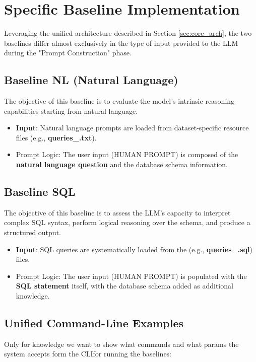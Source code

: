 \section{Specific Baseline Implementation}
\label{sec:Baselines}
Leveraging the unified architecture described in Section \ref{sec:core_arch}, the two baselines differ almost exclusively in the type of input provided to the LLM during the "Prompt Construction" phase.

\subsection{Baseline NL (Natural Language)}
The objective of this baseline is to evaluate the model's intrinsic reasoning capabilities starting from natural language.
\begin{itemize}
    \item \textbf{Input}: Natural language prompts are loaded from dataset-specific resource files (e.g., \textbf{queries\_<dataset-name>.txt}).
    \item Prompt Logic: The user input (HUMAN PROMPT) is composed of the \textbf{natural language question} and the database schema information.
\end{itemize}

\subsection{Baseline SQL}
The objective of this baseline is to assess the LLM's capacity to interpret complex SQL syntax, perform logical reasoning over the schema, and produce a structured output.\begin{itemize}
    \item \textbf{Input}: SQL queries are systematically loaded from the (e.g., \textbf{queries\_<dataset-name>.sql}) files.
    \item Prompt Logic: The user input (HUMAN PROMPT) is populated with the \textbf{SQL statement} itself, with the database schema added as additional knowledge.
\end{itemize}



\subsection{Unified Command-Line Examples}

Only for knowledge we want to show what commands and what params the system accepts form the CLIfor running the baselines:

